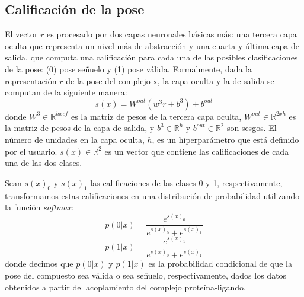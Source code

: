 \subsection{Calificación de la pose}
El vector $r$ es procesado por dos capas neuronales básicas más: una
tercera capa oculta que representa un nivel más de abstracción y una
cuarta y última capa de salida, que computa una calificación para cada
una de las posibles clasificaciones de la pose: (0) pose señuelo y (1)
pose válida. Formalmente, dada la representación $r$ de la pose del
complejo x, la capa oculta y la de salida se computan de la siguiente
manera:
\begin{equation}
  s(x) = W^{out}(w^3r + b^3) + b^{out}
\end{equation}
donde $W^3 \in \mathbb{R}^{hxcf}$ es la matriz de pesos de la tercera
capa oculta, $W^{out} \in \mathbb{R}^{2xh}$ es la matriz de pesos de la
capa de salida, y $b^3 \in \mathbb{R}^h$ y $b^{out} \in \mathbb{R}^2$ son
sesgos. El número de unidades en la capa oculta, $h$, es un hiperparámetro
que está definido por el usuario. $s(x) \in \mathbb{R}^2$ es un vector
que contiene las calificaciones de cada una de las dos clases.

Sean $s(x)_0$ y $s(x)_1$ las calificaciones de las clases 0 y 1,
respectivamente, transformamos estas calificaciones en una
distribución de probabilidad utilizando la función \textit{softmax}:
\begin{equation}
  p(0|x) = \frac{e^{s(x)_0}}{e^{s(x)_0}+e^{s(x)_1}}
\end{equation}
\begin{equation}
  p(1|x) = \frac{e^{s(x)_1}}{e^{s(x)_0}+e^{s(x)_1}}
\end{equation}
donde decimos que $p(0|x)$ y $p(1|x)$ es la probabilidad condicional
de que la pose del compuesto sea válida o sea señuelo,
respectivamente, dados los datos obtenidos a partir del acoplamiento
del complejo proteína-ligando.
